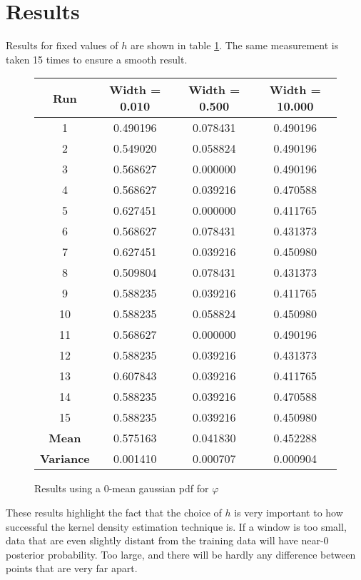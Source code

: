 \documentclass{article}
\begin{document}
\section{Results}

Results for fixed values of $h$ are shown in table \ref{tab:results1}. The same
measurement is taken 15 times to ensure a smooth result.

\begin{figure}[htb]
\centering
\begin{tabular}{|c|c|c|c|}
\hline
{\bf Run} & {\bf Width = 0.010} & {\bf Width = 0.500} & {\bf Width = 10.000} \\ 
\hline
1 & 0.490196 & 0.078431 & 0.490196\\ 
2 & 0.549020 & 0.058824 & 0.490196\\ 
3 & 0.568627 & 0.000000 & 0.490196\\ 
4 & 0.568627 & 0.039216 & 0.470588\\ 
5 & 0.627451 & 0.000000 & 0.411765\\ 
6 & 0.568627 & 0.078431 & 0.431373\\ 
7 & 0.627451 & 0.039216 & 0.450980\\ 
8 & 0.509804 & 0.078431 & 0.431373\\ 
9 & 0.588235 & 0.039216 & 0.411765\\ 
10 & 0.588235 & 0.058824 & 0.450980\\ 
11 & 0.568627 & 0.000000 & 0.490196\\ 
12 & 0.588235 & 0.039216 & 0.431373\\ 
13 & 0.607843 & 0.039216 & 0.411765\\ 
14 & 0.588235 & 0.039216 & 0.470588\\ 
15 & 0.588235 & 0.039216 & 0.450980\\ 
\hline 
{\bf Mean} & 0.575163 & 0.041830 & 0.452288\\ 
{\bf Variance}  & 0.001410 & 0.000707 & 0.000904\\ 
\hline 
\end{tabular}
\caption{Results using a 0-mean gaussian pdf for $\varphi$}
\label{tab:results1}
\end{figure}

These results highlight the fact that the choice of $h$ is very important to how
successful the kernel density estimation technique is. If a window is too small,
data that are even slightly distant from the training data will have near-0
posterior probability. Too large, and there will be hardly any difference
between points that are very far apart.
\end{document}
